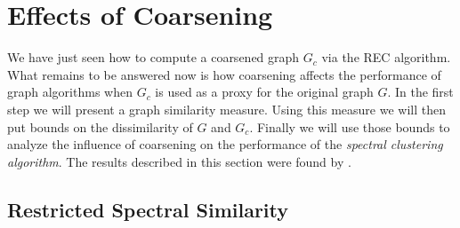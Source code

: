 \section{Effects of Coarsening}%
\label{sec:cons}

We have just seen how to compute a coarsened graph $G_c$ via the REC algorithm.
What remains to be answered now is how coarsening affects the performance of graph algorithms when $G_c$ is used as a proxy for the original graph $G$.
In the first step we will present a graph similarity measure.
Using this measure we will then put bounds on the dissimilarity of $G$ and $G_c$.
Finally we will use those bounds to analyze the influence of coarsening on the performance of the \textit{spectral clustering algorithm}.
The results described in this section were found by \citet{Loukas2018}.

\subsection{Restricted Spectral Similarity}%
\label{sec:cons:rss}


